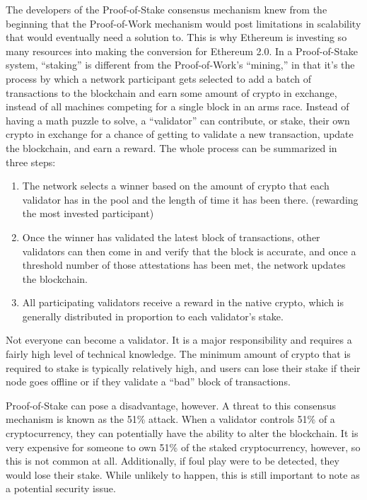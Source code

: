The developers of the Proof-of-Stake consensus mechanism knew from the beginning that the Proof-of-Work mechanism would post limitations in scalability that would eventually need a solution to. This is  why Ethereum is investing so many resources into making the conversion for Ethereum 2.0. In a Proof-of-Stake system, “staking” is different from the Proof-of-Work’s “mining,” in that it’s the process by which a network participant gets selected to add a batch of transactions to the blockchain and earn some amount of crypto in exchange, instead of all machines competing for a single block in an arms race. Instead of having a math puzzle to solve, a “validator” can contribute, or stake, their own crypto in exchange for a chance of getting to validate a new transaction, update the blockchain, and earn a reward. The whole process can be summarized in three steps:
  \begin{enumerate}
    \item The network selects a winner based on the amount of crypto that each validator has in the pool and the length of time it has been there. (rewarding the most invested participant) 
    
    \item Once the winner has validated the latest block of transactions, other validators can then come in and verify that the block is accurate, and once a threshold number of those attestations has been met, the network updates the blockchain.
    
    \item All participating validators receive a reward in the native crypto, which is generally distributed in proportion to each validator’s stake. 
    
  \end{enumerate}	

Not everyone can become a validator. It is a major responsibility and requires a fairly high level of technical knowledge. The minimum amount of crypto that is required to stake is typically relatively high, and users can lose their stake if their node goes offline or if they validate a “bad” block of transactions. 

Proof-of-Stake can pose a disadvantage, however. A threat to this consensus mechanism is known as the 51\% attack. When a validator controls 51\% of a cryptocurrency, they can potentially have the ability to alter the blockchain. It is very expensive for someone to own 51\% of the staked cryptocurrency, however, so this is not common at all. Additionally, if foul play were to be detected, they would lose their stake. While unlikely to happen, this is still important to note as a potential security issue.

